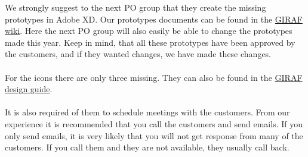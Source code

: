 \noindent
We strongly suggest to the next PO group that they create the missing prototypes in Adobe XD.
Our prototypes documents can be found in the \href{https://github.com/aau-giraf/wiki/tree/master/design_guide/prototypes}{GIRAF wiki}. 
Here the next PO group will also easily be able to change the prototypes made this year.
Keep in mind, that all these prototypes have been approved by the customers, and if they wanted changes, we have made these changes.
\\\\
For the icons there are only three missing. They can also be found in the \href{https://github.com/aau-giraf/wiki/blob/master/design_guide/icons.md}{GIRAF design guide}. 
\\\\
It is also required of them to schedule meetings with the customers.
From our experience it is recommended that you call the customers and send emails. 
If you only send emails, it is very likely that you will not get response from many of the customers. 
If you call them and they are not available, they usually call back.
